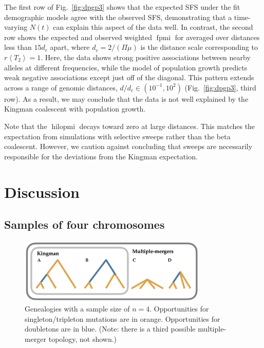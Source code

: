 \documentclass[11pt, letterpaper]{article}   	%
\newcommand{\fig}[1]{Fig.~\ref{#1}}
\newcommand{\E}[1]{\left< #1 \right>}
\DeclareMathOperator{\fpmi}{fpmi}
\DeclareMathOperator{\hilopmi}{hilopmi}
\begin{document}
The first row of \fig{fig:dpgp3} shows that the expected SFS under the fit demographic models agree with the observed SFS, demonstrating that a time-varying $N(t)$ can explain this aspect of the data well.
In contrast, the second row shows the expected and observed weighted $\fpmi$ for averaged over distances less than $15 d_c$ apart, where $d_c = 2/ (\Pi \mu)$ is the distance scale corresponding to $r\E{T_2} = 1$.
Here, the data shows strong positive associations between nearby alleles at different frequencies, while the model of population growth predicts weak negative associations except just off of the diagonal.
This pattern extends across a range of genomic distances, $d/d_c \in (10^{-1}, 10^2)$ (\fig{fig:dpgp3}, third row).
As a result, we may conclude that the data is not well explained by the Kingman coalescent with population growth.

Note that the $\hilopmi$ decays toward zero at large distances.
This matches the expectation from simulations with selective sweeps rather than the beta coalescent.
However, we caution against concluding that sweeps are necessarily responsible for the deviations from the Kingman expectation.


\section*{Discussion}

\subsection*{Samples of four chromosomes}

\begin{figure}
\centering
\includegraphics[width=0.8\textwidth]{figures/trees.png}
\caption{Genealogies with a sample size of $n=4$. Opportunities for singleton/tripleton mutations are in orange. Opportunities for doubletons are in blue. (Note: there is a third possible multiple-merger topology, not shown.) \label{fig:trees}}
\end{figure}
\end{document}
